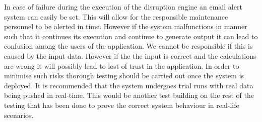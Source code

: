 In case of failure during the execution of the disruption engine an email alert system can easily be set. This will allow for the responsible maintenance personnel to be alerted in time. However if the system malfunctions in manner such that it continues its execution and continue to generate output it can lead to confusion among the users of the application. We cannot be responsible if this is caused by the input data. However if the the input is correct and the calculations are wrong it will possibly lead to lost of trust in the application. In order to minimise such risks thorough testing should be carried out once the system is deployed. It is recommended that the system undergoes trial runs with real data being pushed in real-time. This would be another test building on the rest of the testing that has been done to prove the correct system behaviour in real-life scenarios.



